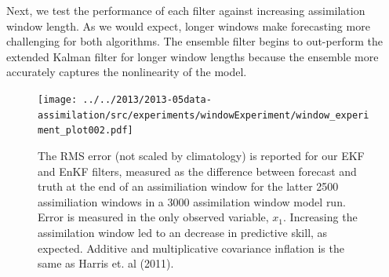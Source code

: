 
Next, we test the performance of each filter against increasing assimilation window length.
As we would expect, longer windows make forecasting more challenging for both algorithms.
The ensemble filter begins to out-perform the extended Kalman filter for longer window lengths because the ensemble more accurately captures the nonlinearity of the model.

\begin{figure}[h!]
  \centering
  \texttt{[image: ../../2013/2013-05data-assimilation/src/experiments/windowExperiment/window\_experiment\_plot002.pdf]}
  \caption[The RMS error is reported for our EKF and EnKF filters]{
    The RMS error (not scaled by climatology) is reported for our EKF and EnKF filters, measured as the difference between forecast and truth at the end of an assimiliation window for the latter 2500 assimiliation windows in a 3000 assimilation window model run.
    Error is measured in the only observed variable, $x_1$.
    Increasing the assimilation window led to an decrease in predictive skill, as expected.
    Additive and multiplicative covariance inflation is the same as Harris et. al (2011).
  }
  \label{fig:window_test}
\end{figure}

